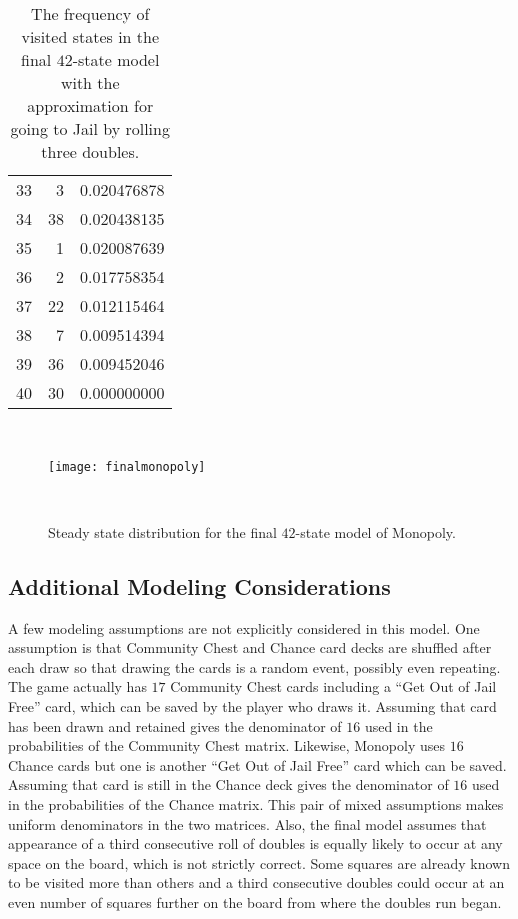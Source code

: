\documentclass[12pt]{article}
\begin{document}
\begin{table}
\begin{tabular}{rrr}
        33 & 3     & 0.020476878 \\ 
        34 & 38    & 0.020438135 \\ 
        35 & 1     & 0.020087639 \\ 
        36 & 2     & 0.017758354 \\ 
        37 & 22    & 0.012115464 \\ 
        38 & 7     & 0.009514394 \\ 
        39 & 36    & 0.009452046 \\ 
        40 & 30    & 0.000000000 \\ 
    \end{tabular}
    \caption{The frequency of visited states in the final \( 42 \)-state
    model with the approximation for going to Jail by rolling three
    doubles.}~%
    \label{tab:monopoly:finalmonopoly}
\end{table}

\begin{figure}
    \centering
    \texttt{[image: finalmonopoly]}
    \caption{Steady state distribution for the final \( 42 \)-state
    model of Monopoly.}~%
    \label{fig:monopoly:finalmonopoly}
\end{figure}

\subsection*{Additional Modeling Considerations} A few modeling
assumptions are not explicitly considered in this model.  One assumption
is that Community Chest and Chance card decks are shuffled after each
draw so that drawing the cards is a random event, possibly even
repeating.  The game actually has \( 17 \) Community Chest cards
including a ``Get Out of Jail Free'' card, which can be saved by the
player who draws it.  Assuming that card has been drawn and retained
gives the denominator of \( 16 \) used in the probabilities of the
Community Chest matrix.  Likewise, Monopoly uses \( 16 \) Chance cards
but one is another ``Get Out of Jail Free'' card which can be saved.
Assuming that card is still in the Chance deck gives the denominator of \(
16 \) used in the probabilities of the Chance matrix.  This pair of
mixed assumptions makes uniform denominators in the two matrices.  Also,
the final model assumes that appearance of a third consecutive roll of
doubles is equally likely to occur at any space on the board, which is
not strictly correct.  Some squares are already known to be visited more
than others and a third consecutive doubles could occur at an even
number of squares further on the board from where the doubles run began.
\end{document}
